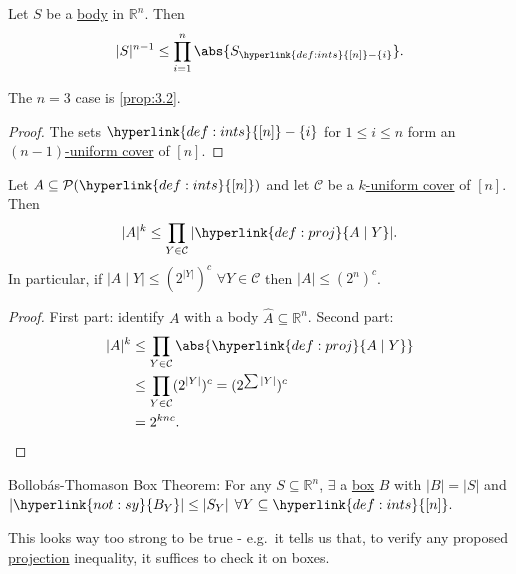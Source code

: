 \documentclass{article}
\newcommand{\named}[1]{\textbf{#1}\index{#1}}
\let\subset\subseteq
\begin{document}
\begin{ncor}\label{cor:3.4}
  Let $S$ be a \hyperlink{def:body}{body} in $\mathbb{R}^n$.
  Then
  \begin{equation*}
    |S|^{n-1} \leq \prod_{i=1}^n \abs{S_{\hyperlink{def:ints}{[n]} - \{i\}}}.
  \end{equation*}
\end{ncor}
\begin{remark}
  The $n=3$ case is \cref{prop:3.2}.
\end{remark}
\begin{proof}
  The sets $\hyperlink{def:ints}{[n]}- \{i\}$ for $1 \leq i \leq n$ form an \hyperlink{def:cover}{$(n-1)$-uniform cover} of $[n]$.
\end{proof}
\begin{ncor}\label{cor:3.5}
  Let $A \subset \mathcal{P}(\hyperlink{def:ints}{[n]})$ and let $\mathcal{C}$ be a \hyperlink{def:cover}{$k$-uniform cover} of $[n]$.
  Then
  \begin{equation*}|A|^k \leq \prod_{Y \in \mathcal{C}} |\hyperlink{def:proj}{A \mid Y}|.\end{equation*}
  In particular, if $|A \mid Y| \leq (2^{|Y|})^c$ $\forall Y \in \mathcal{C}$ then $|A| \leq (2^n)^c$.
\end{ncor}
\begin{proof}
  First part: identify $A$ with a body $\hat{A} \subseteq \mathbb{R}^n$.
  Second part:
  \begin{align*}
    |A|^k &\leq \prod_{Y \in \mathcal{C}} \abs{\hyperlink{def:proj}{A \mid Y}} \\
          &\leq \prod_{Y \in \mathcal{C}} (2^{|Y|})^c = (2^{\sum|Y|})^c \\
          &= 2^{k nc}. \qedhere
  \end{align*}
\end{proof}
\begin{aim}
  Bollob\'as-Thomason Box Theorem: For any $S \subset \mathbb{R}^n$, $\exists$ a \hyperlink{def:box}{box} $B$ with $|B| = |S|$ and $|\hyperlink{not:sy}{B_Y}| \leq |S_Y|$ $\forall Y \subseteq \hyperlink{def:ints}{[n]}.$

  This looks way too strong to be true - e.g.\ it tells us that, to verify any proposed \hyperlink{def:proj}{projection} inequality, it suffices to check it on boxes.
\end{aim}
\end{document}

